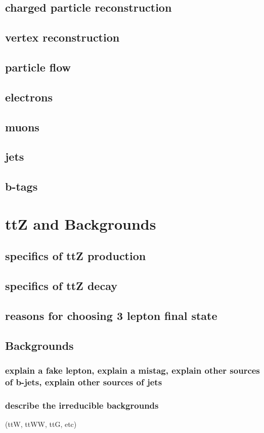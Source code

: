 \documentclass[12pt,chapterheads,oneside]{ucsd}
\begin{document}
	\section{charged particle reconstruction}
	\section{vertex reconstruction}
	\section{particle flow}
	\section{electrons}
	\section{muons}
	\section{jets}
	\section{b-tags}

\chapter{ttZ and Backgrounds}
	\section{specifics of ttZ production}
	\section{specifics of ttZ decay}
	\section{reasons for choosing 3 lepton final state}
	\section{Backgrounds}
		\subsection{explain a fake lepton, explain a mistag, explain other sources of b-jets, explain other sources of jets}
        		\subsection{describe the irreducible backgrounds} 
			(ttW, ttWW, ttG, etc)
\end{document}
